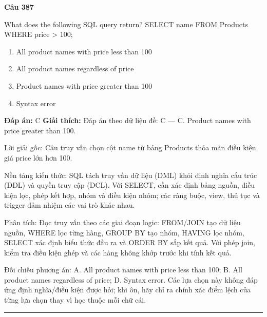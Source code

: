 \documentclass[11pt,a4paper]{article}
\newenvironment{question}[1]{%
  \par\vspace{1em}\noindent\textbf{\large Câu #1}\par\vspace{0.4em}
}{%
  \par\vspace{1em}\hrule\vspace{0.6em}
}
\newenvironment{choices}{%
  \begin{enumerate}[label=\textbf{\Alph*.},leftmargin=2.2em,itemsep=2pt,topsep=3pt]
}{%
  \end{enumerate}
}
\newcommand{\choice}{\item}
\begin{document}
\begin{question}{387}
What does the following SQL query return? SELECT name FROM Products WHERE price > 100;
\begin{choices}
\choice All product names with price less than 100
\choice All product names regardless of price
\choice Product names with price greater than 100
\choice Syntax error
\end{choices}
\textbf{Đáp án:} C
\textbf{Giải thích:} Đáp án theo dữ liệu đề: C — C. Product names with price greater than 100.

Lời giải gốc: Câu truy vấn chọn cột name từ bảng Products thỏa mãn điều kiện giá price lớn hơn 100.

Nền tảng kiến thức: SQL tách truy vấn dữ liệu (DML) khỏi định nghĩa cấu trúc (DDL) và quyền truy cập (DCL). Với SELECT, cần xác định bảng nguồn, điều kiện lọc, phép kết hợp, nhóm và điều kiện nhóm; các ràng buộc, view, thủ tục và trigger đảm nhiệm các vai trò khác nhau.

Phân tích: Đọc truy vấn theo các giai đoạn logic: FROM/JOIN tạo dữ liệu nguồn, WHERE lọc từng hàng, GROUP BY tạo nhóm, HAVING lọc nhóm, SELECT xác định biểu thức đầu ra và ORDER BY sắp kết quả. Với phép join, kiểm tra điều kiện ghép và các hàng không khớp trước khi tính kết quả.

Đối chiếu phương án: A. All product names with price less than 100; B. All product names regardless of price; D. Syntax error. Các lựa chọn này không đáp ứng định nghĩa/điều kiện được hỏi; khi ôn, hãy chỉ ra chính xác điểm lệch của từng lựa chọn thay vì học thuộc mỗi chữ cái.
\end{question}
\end{document}
